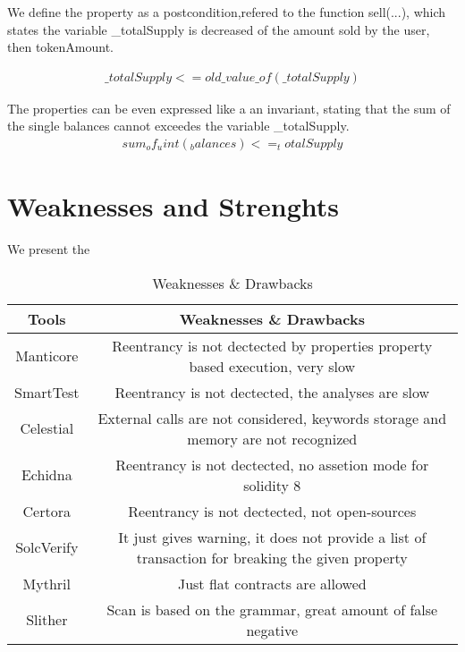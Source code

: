 We define the property as a postcondition,refered to the function sell(...), which states the variable \_totalSupply is decreased of the amount sold by the user, then tokenAmount.

\begin{equation}
    \begin{split}
        \_totalSupply <=old\_value\_of(\_totalSupply)
    \end{split}
\end{equation}

The properties can be even expressed like a an invariant, stating that the sum of the single balances cannot exceedes the variable \_totalSupply.
\begin{equation}
    \begin{split}
        sum_of_uint(_balances) <= _totalSupply
    \end{split}
\end{equation}


\section{Weaknesses and Strenghts}

We present the 
\begin{table*}
    \caption{Weaknesses \& Drawbacks}
    \label{tab:Weaknesses}
    \begin{tabular}{cc}
    \toprule
        Tools  &  Weaknesses \& Drawbacks \\
        \midrule
        Manticore & Reentrancy is not dectected by properties property 
        based execution, very slow \\
        SmartTest & Reentrancy is not dectected, the analyses are slow \\
        Celestial & External calls are not considered, keywords storage and 
        memory are not recognized  \\
        Echidna &  Reentrancy is not dectected, no assetion mode for solidity 8\\
        Certora & Reentrancy is not dectected, not open-sources \\ 
        SolcVerify & It just gives warning, it does not provide a list of 
        transaction for breaking the given property\\
        Mythril & Just flat contracts are allowed \\ 
        Slither & Scan is based on the grammar, great amount of false negative \\ 
    \bottomrule
    \end{tabular}
\end{table*}

